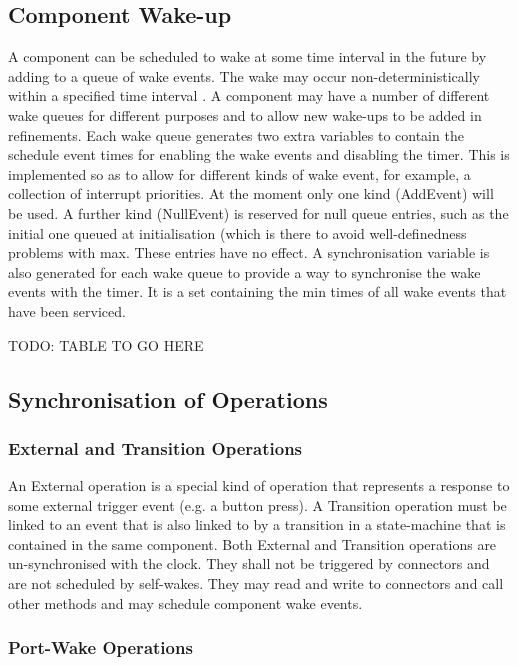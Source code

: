  \subsection{Component Wake-up}

A component can be scheduled to wake at some time interval in the future by adding to a queue of wake events. The wake may occur non-deterministically within a specified time interval . A component may have a number of different wake queues for different purposes and to allow new wake-ups to be added in refinements. Each wake queue generates two extra variables to contain the schedule event times for enabling the wake events and disabling the timer. This is implemented so as to allow for different kinds of wake event, for example, a collection of interrupt priorities. At the moment only one kind (AddEvent) will be used. A further kind (NullEvent) is reserved for null queue entries, such as the initial one queued at initialisation (which is there to avoid well-definedness problems with max. These entries have no effect. A synchronisation variable is also generated for each wake queue to provide a way to synchronise the wake events with the timer. It is a set containing the min times of all wake events that have been serviced.
 
 TODO: TABLE TO GO HERE
 

%
\subsection{Synchronisation of Operations}


\subsubsection{External and Transition Operations}

An External operation is a special kind of operation that represents a response to some external trigger event (e.g. a button press). 
A Transition operation must be linked to an event that is also linked to by a transition in a state-machine that is contained in the same component.
Both External and Transition operations are un-synchronised with the clock. They shall not be triggered by connectors and are not scheduled by self-wakes. They may read and write to connectors and call other methods and may schedule component wake events.

\subsubsection{Port-Wake Operations}

